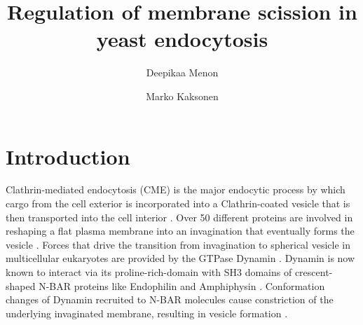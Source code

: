 \documentclass[9pt,lineno]{elife}
\title{Regulation of membrane scission in yeast endocytosis}
\author[1]{Deepikaa Menon}
\author[1*]{Marko Kaksonen}
\affil[1]{Department of Biochemistry, University of Geneva, Geneva, Switzerland}
\begin{document}
\maketitle

\begin{abstract}

\end{abstract}


\section{Introduction}

Clathrin-mediated endocytosis (CME) is the major endocytic process by which cargo from the cell exterior is incorporated into a Clathrin-coated vesicle that is then transported into the cell interior \citep{Bitsikas2014}. Over 50 different proteins are involved in reshaping a flat plasma membrane into an invagination that eventually forms the vesicle \citep{Kaksonen2018}. Forces that drive the transition from invagination to spherical vesicle in multicellular eukaryotes are provided by the GTPase Dynamin \citep{Grigliatti1973, Sweitzer1998, Ferguson2007,Takei1995, Galli2017}. Dynamin is now known to interact via its proline-rich-domain with SH3 domains of crescent-shaped N-BAR proteins like Endophilin and Amphiphysin  \citep{Grabs1997,Cestra1999,Farsad2001,Ferguson2009,Meinecke2013b}. Conformation changes of Dynamin recruited to N-BAR molecules cause constriction of the underlying invaginated membrane, resulting in vesicle formation  \citep{Shupliakov1997,Zhang2001,Zhao2016}.

~\\
\end{document}
